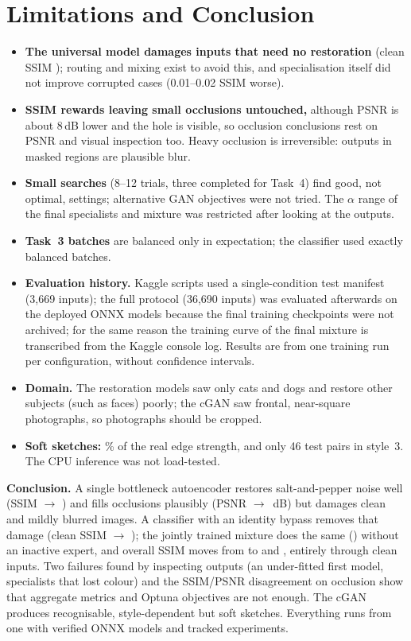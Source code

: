 \section{Limitations and Conclusion}\label{sec:limits}
\begin{itemize}
\item \textbf{The universal model damages inputs that need no restoration} (clean SSIM \nTOneSSIMclean{}); routing and mixing exist to avoid this, and specialisation itself did not improve corrupted cases (0.01--0.02 SSIM worse).
\item \textbf{SSIM rewards leaving small occlusions untouched,} although PSNR is about 8\,dB lower and the hole is visible, so occlusion conclusions rest on PSNR and visual inspection too. Heavy occlusion is irreversible: outputs in masked regions are plausible blur.
\item \textbf{Small searches} (8--12 trials, three completed for Task~4) find good, not optimal, settings; alternative GAN objectives were not tried. The $\alpha$ range of the final specialists and mixture was restricted after looking at the outputs.
\item \textbf{Task~3 batches} are balanced only in expectation; the classifier used exactly balanced batches.
\item \textbf{Evaluation history.} Kaggle scripts used a single-condition test manifest (3,669 inputs); the full protocol (36,690 inputs) was evaluated afterwards on the deployed ONNX models because the final training checkpoints were not archived; for the same reason the training curve of the final mixture is transcribed from the Kaggle console log. Results are from one training run per configuration, without confidence intervals.
\item \textbf{Domain.} The restoration models saw only cats and dogs and restore other subjects (such as faces) poorly; the cGAN saw frontal, near-square photographs, so photographs should be cropped.
\item \textbf{Soft sketches:} \nSharpShareAll\% of the real edge strength, and only 46 test pairs in style~3. The CPU inference was not load-tested.
\end{itemize}

\textbf{Conclusion.} A single bottleneck autoencoder restores salt-and-pepper noise well (SSIM \nInputSSIMsaltpepper{} $\to$ \nTOneSSIMsaltpepper{}) and fills occlusions plausibly (PSNR \nInPSNRocclusion{} $\to$ \nTOnePSNRocclusion{}\,dB) but damages clean and mildly blurred images. A classifier with an identity bypass removes that damage (clean SSIM \nTOneSSIMclean{} $\to$ \nHardSSIMclean{}); the jointly trained mixture does the same (\nSoftSSIMclean{}) without an inactive expert, and overall SSIM moves from \nTOneSSIMall{} to \nHardPredSSIM{} and \nSoftSSIM{}, entirely through clean inputs. Two failures found by inspecting outputs (an under-fitted first model, specialists that lost colour) and the SSIM/PSNR disagreement on occlusion show that aggregate metrics and Optuna objectives are not enough. The cGAN produces recognisable, style-dependent but soft sketches. Everything runs from one  with verified ONNX models and tracked experiments.
